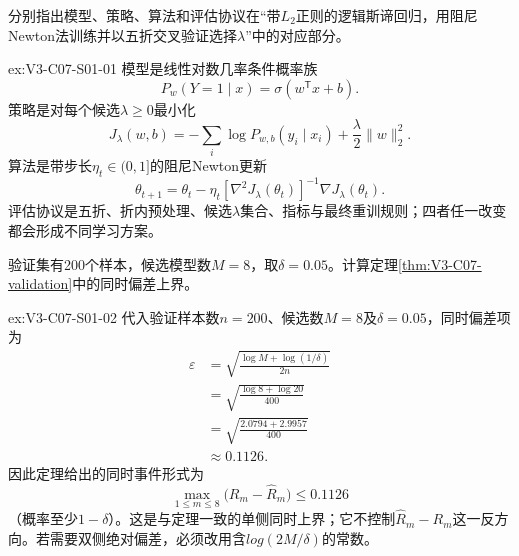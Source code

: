\begin{SLChapterExercisePairSection}

\begin{exercise}\label{ex:V3-C07-S01-01}
分别指出模型、策略、算法和评估协议在“带$L_2$正则的逻辑斯谛回归，用阻尼Newton法训练并以五折交叉验证选择$\lambda$”中的对应部分。
\end{exercise}
\ifSLFullEdition
{}\label{sol:V3-C07-S01-01}
\begin{chapterexercisesolution}{ex:V3-C07-S01-01}
模型是线性对数几率条件概率族
\[
P_w(Y=1\mid x)=\sigma(w^{\mathsf T}x+b).
\]
策略是对每个候选$\lambda\geq0$最小化
\[
J_\lambda(w,b)
=-\sum_i\log P_{w,b}(y_i\mid x_i)
+\frac{\lambda}{2}\lVert w\rVert_2^2.
\]
算法是带步长$\eta_t\in(0,1]$的阻尼Newton更新
\[
\theta_{t+1}=\theta_t-\eta_t[\nabla^2J_\lambda(\theta_t)]^{-1}
\nabla J_\lambda(\theta_t).
\]
评估协议是五折、折内预处理、候选$\lambda$集合、指标与最终重训规则；四者任一改变都会形成不同学习方案。
\end{chapterexercisesolution}
\fi

\begin{exercise}\label{ex:V3-C07-S01-02}
验证集有200个样本，候选模型数$M=8$，取$\delta=0.05$。计算定理\ref{thm:V3-C07-validation}中的同时偏差上界。
\end{exercise}
\ifSLFullEdition
{}\label{sol:V3-C07-S01-02}
\begin{chapterexercisesolution}{ex:V3-C07-S01-02}
代入验证样本数$n=200$、候选数$M=8$及$\delta=0.05$，同时偏差项为
\[
\begin{aligned}
\varepsilon
&=\sqrt{\frac{\log M+\log(1/\delta)}{2n}}\\
&=\sqrt{\frac{\log8+\log20}{400}}\\
&=\sqrt{\frac{2.0794+2.9957}{400}}\\
&\approx0.1126.
\end{aligned}
\]
因此定理给出的同时事件形式为
\[
\max_{1\leq m\leq8}\bigl(R_m-\widehat R_m\bigr)\leq0.1126
\]
（概率至少$1-\delta$）。这是与定理一致的单侧同时上界；它不控制$\widehat R_m-R_m$这一反方向。若需要双侧绝对偏差，必须改用含$log(2M/\delta)$的常数。
\end{chapterexercisesolution}
\fi


\end{SLChapterExercisePairSection}
